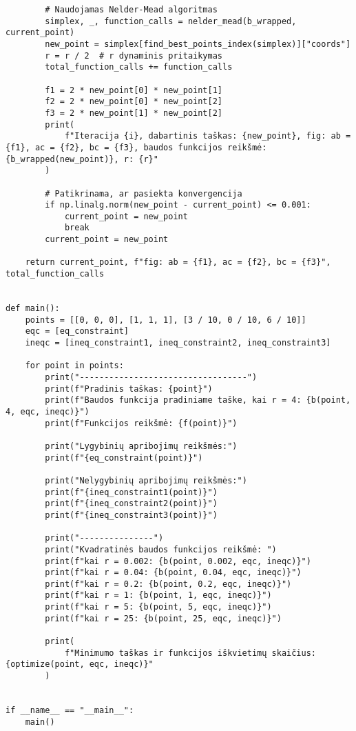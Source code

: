 \documentclass[a4paper,12pt,fleqn]{article}
\begin{document}
\begin{verbatim}
        # Naudojamas Nelder-Mead algoritmas
        simplex, _, function_calls = nelder_mead(b_wrapped, current_point)
        new_point = simplex[find_best_points_index(simplex)]["coords"]
        r = r / 2  # r dynaminis pritaikymas
        total_function_calls += function_calls

        f1 = 2 * new_point[0] * new_point[1]
        f2 = 2 * new_point[0] * new_point[2]
        f3 = 2 * new_point[1] * new_point[2]
        print(
            f"Iteracija {i}, dabartinis taškas: {new_point}, fig: ab = {f1}, ac = {f2}, bc = {f3}, baudos funkcijos reikšmė: {b_wrapped(new_point)}, r: {r}"
        )

        # Patikrinama, ar pasiekta konvergencija
        if np.linalg.norm(new_point - current_point) <= 0.001:
            current_point = new_point
            break
        current_point = new_point

    return current_point, f"fig: ab = {f1}, ac = {f2}, bc = {f3}", total_function_calls


def main():
    points = [[0, 0, 0], [1, 1, 1], [3 / 10, 0 / 10, 6 / 10]]
    eqc = [eq_constraint]
    ineqc = [ineq_constraint1, ineq_constraint2, ineq_constraint3]

    for point in points:
        print("----------------------------------")
        print(f"Pradinis taškas: {point}")
        print(f"Baudos funkcija pradiniame taške, kai r = 4: {b(point, 4, eqc, ineqc)}")
        print(f"Funkcijos reikšmė: {f(point)}")

        print("Lygybinių apribojimų reikšmės:")
        print(f"{eq_constraint(point)}")

        print("Nelygybinių apribojimų reikšmės:")
        print(f"{ineq_constraint1(point)}")
        print(f"{ineq_constraint2(point)}")
        print(f"{ineq_constraint3(point)}")

        print("---------------")
        print("Kvadratinės baudos funkcijos reikšmė: ")
        print(f"kai r = 0.002: {b(point, 0.002, eqc, ineqc)}")
        print(f"kai r = 0.04: {b(point, 0.04, eqc, ineqc)}")
        print(f"kai r = 0.2: {b(point, 0.2, eqc, ineqc)}")
        print(f"kai r = 1: {b(point, 1, eqc, ineqc)}")
        print(f"kai r = 5: {b(point, 5, eqc, ineqc)}")
        print(f"kai r = 25: {b(point, 25, eqc, ineqc)}")

        print(
            f"Minimumo taškas ir funkcijos iškvietimų skaičius: {optimize(point, eqc, ineqc)}"
        )


if __name__ == "__main__":
    main()

\end{verbatim}
\end{document}
